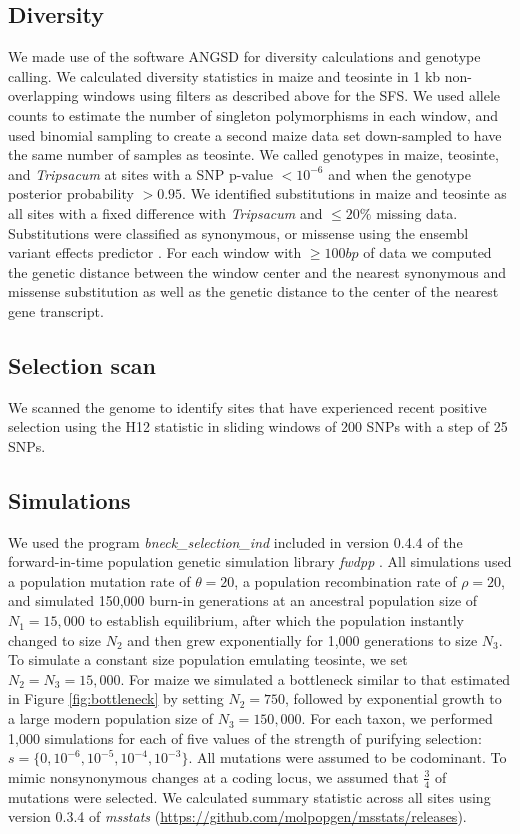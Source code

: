 \documentclass[12pt,a4paper]{article}
\begin{document}
\subsection*{Diversity}
We made use of the software ANGSD \cite{korneliussen2014} for diversity calculations and genotype calling. 
We calculated diversity statistics in maize and teosinte in 1 kb non-overlapping windows using filters as described above for the SFS. 
We used allele counts to estimate the number of singleton polymorphisms in each window, and used binomial sampling to create a second maize data set down-sampled to have the same number of samples as teosinte.
We called genotypes in maize, teosinte, and \textit{ Tripsacum} at sites with a SNP p-value $<10^{-6}$ and when the genotype posterior probability $>0.95$. 
We identified substitutions in maize and teosinte as all sites with a fixed difference with \textit{Tripsacum} and $\leq 20\%$ missing data. 
Substitutions were classified as synonymous, or missense using the ensembl variant effects predictor \cite{mclaren2010}.
For each window with $\geq 100bp$ of data we computed the genetic distance between the window center and the nearest synonymous and missense substitution as well as the genetic distance to the center of the nearest gene transcript.  

\subsection*{Selection scan}
We scanned the genome to identify sites that have experienced recent positive selection using the H12 statistic \cite{garud2015} in sliding windows of 200 SNPs with a step of 25 SNPs.

\subsection*{Simulations}
We used the program \emph{bneck\_selection\_ind} included in version 0.4.4 of the forward-in-time population genetic simulation library \emph{fwdpp} \citep[\url{https://github.com/molpopgen/fwdpp}[]{thornton2014genetics}. 
All simulations used a population mutation rate of $\theta=20$, a population recombination rate of $\rho=20$, and simulated 150,000 burn-in generations at an ancestral population size of $N_1=15,000$ to establish equilibrium, after which the population instantly changed to size $N_2$ and then grew exponentially for 1,000 generations to size $N_3$. 
To simulate a constant size population emulating teosinte, we set $N_2=N_3=15,000$.
For maize we simulated a bottleneck similar to that estimated in Figure \ref{fig:bottleneck} by setting $N_2=750$,   followed by exponential growth to a large modern population size of $N_3=150,000$. 
For each taxon, we performed 1,000 simulations for each of five values of the strength of purifying selection: $s=\{0,10^{-6},10^{-5},10^{-4},10^{-3}\}$. 
All mutations were assumed to be codominant.
To mimic nonsynonymous changes at a coding locus, we assumed that $\frac{3}{4}$ of mutations were selected.
We calculated summary statistic across all sites using version 0.3.4 of \emph{msstats} (\url{https://github.com/molpopgen/msstats/releases}).
\end{document}
